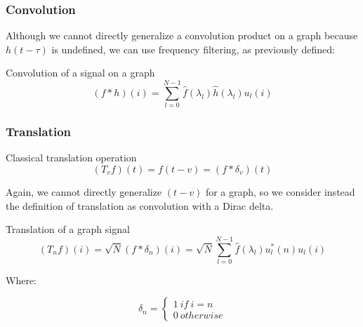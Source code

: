 \documentclass{beamer}
\begin{document}
\begin{frame}
  \frametitle{Convolution}

  Although we cannot directly generalize a convolution product on a graph
  because $h(t - \tau)$ is undefined, we can use frequency filtering, as
  previously defined:
  
  \begin{block}{Convolution of a signal on a graph}
    \begin{equation}
      (f * h)(i) = \sum_{l=0}^{N-1} \hat{f}(\lambda_l) \hat{h}(\lambda_l) u_l(i)
    \end{equation}
  \end{block}  
\end{frame}

\begin{frame}
  \frametitle{Translation}

  \begin{block}{Classical translation operation}
    \begin{equation}
      (T_vf)(t) = f(t - v) = (f * \delta_v)(t)
    \end{equation}
  \end{block}  

  Again, we cannot directly generalize $(t - v)$ for a graph, so we consider
  instead the definition of translation as convolution with a Dirac delta. 
  
  \begin{block}{Translation of a graph signal}
    \begin{equation}
     (T_n f)(i) = \sqrt{N} (f * \delta_n)(i) = \sqrt{N} \sum_{l=0}^{N-1} \hat{f}(\lambda_l) u_l^*(n) u_l(i)
    \end{equation}
  \end{block}  

Where:

\begin{equation}
  \delta_n =
  \begin{cases}
    1 \ if \ i=n \\
    0 \ otherwise
  \end{cases}
\end{equation}

\end{frame}
\end{document}
